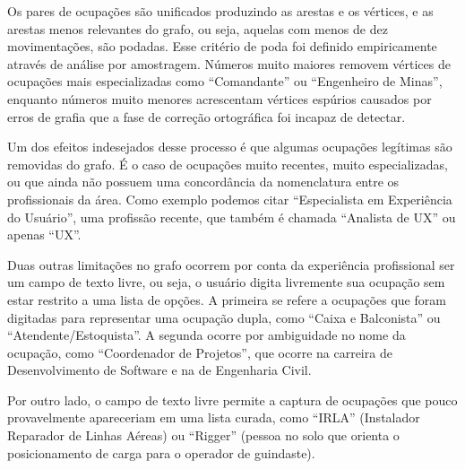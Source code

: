\documentclass[12pt,a4paper]{article}
\begin{document}
Os pares de ocupações são unificados produzindo as arestas e os vértices, e as arestas menos relevantes do grafo, ou seja, aquelas com menos de dez movimentações, são podadas. Esse critério de poda foi definido empiricamente através de análise por amostragem. Números muito maiores removem vértices de ocupações mais especializadas como \enquote{Comandante} ou \enquote{Engenheiro de Minas}, enquanto números muito menores acrescentam vértices espúrios causados por erros de grafia que a fase de correção ortográfica foi incapaz de detectar.

Um dos efeitos indesejados desse processo é que algumas ocupações legítimas são removidas do grafo. É o caso de ocupações muito recentes, muito especializadas, ou que ainda não possuem uma concordância da nomenclatura entre os profissionais da área. Como exemplo podemos citar \enquote{Especialista em Experiência do Usuário}, uma profissão recente, que também é chamada \enquote{Analista de UX} ou apenas \enquote{UX}.


Duas outras limitações no grafo ocorrem por conta da experiência profissional ser um campo de texto livre, ou seja, o usuário digita livremente sua ocupação sem estar restrito a uma lista de opções. A primeira se refere a ocupações que foram digitadas para representar uma ocupação dupla, como \enquote{Caixa e Balconista} ou \enquote{Atendente/Estoquista}. A segunda ocorre por ambiguidade no nome da ocupação, como \enquote{Coordenador de Projetos}, que ocorre na carreira de Desenvolvimento de Software e na de Engenharia Civil.

Por outro lado, o campo de texto livre permite a captura de ocupações que pouco provavelmente apareceriam em uma lista curada, como \enquote{IRLA} (Instalador Reparador de Linhas Aéreas) ou \enquote{Rigger} (pessoa no solo que orienta o posicionamento de carga para o operador de guindaste).
\end{document}
